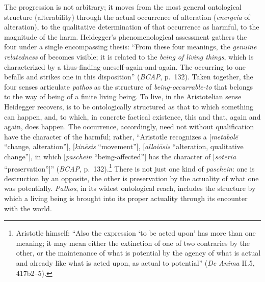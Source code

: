 The progression is not arbitrary; it moves from the most general ontological structure (alterability) through the actual occurrence of alteration (\textit{energeia} of alteration), to the qualitative determination of that occurrence as harmful, to the magnitude of the harm. Heidegger's phenomenological assessment gathers the four under a single encompassing thesis: ``From these four meanings, the \textit{genuine relatedness} of  becomes visible; it is related to the \textit{being of living things}, which is characterized by a thus-finding-oneself-again-and-again. The occurring to one befalls and strikes one in this disposition'' (\textit{BCAP}, p.~132). Taken together, the four senses articulate \textit{pathos} as the structure of \textit{being-occurrable-to} that belongs to the way of being of a finite living being. To live, in the Aristotelian sense Heidegger recovers, is to be ontologically structured as that to which something can happen, and, to which, in concrete factical existence, this and that, again and again, does happen. The occurrence, accordingly, need not without qualification have the character of the harmful; rather, ``Aristotle recognizes a  [\textit{metabolē} ``change, alteration''],  [\textit{kinēsis} ``movement''],  [\textit{alloiōsis} ``alteration, qualitative change''], in which  [\textit{paschein} ``being-affected''] has the character of  [\textit{sōtēria} ``preservation'']'' (\textit{BCAP}, p.~132).\footnote{Aristotle himself: ``Also the expression `to be acted upon' has more than one meaning; it may mean either the extinction of one of two contraries by the other, or the maintenance of what is potential by the agency of what is actual and already like what is acted upon, as actual to potential'' (\textit{De Anima} II.5, 417b2--5).} There is not just one kind of \textit{paschein}: one is destruction by an opposite, the other is preservation by the actuality of what one was potentially. \textit{Pathos}, in its widest ontological reach, includes the structure by which a living being is brought into its proper actuality through its encounter with the world.

